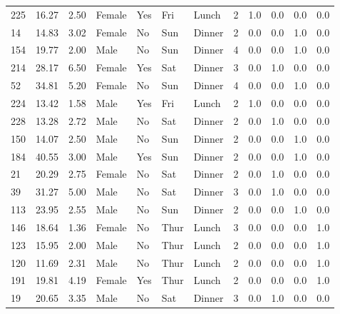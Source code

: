 \documentclass[
  letterpaper,
  DIV=11,
  numbers=noendperiod]{scrreprt}
\begin{document}
\begin{tabular}{lrrllllrrrrr}
225 &       16.27 &  2.50 &  Female &    Yes &   Fri &   Lunch &     2 &     1.0 &     0.0 &     0.0 &      0.0 \\
14  &       14.83 &  3.02 &  Female &     No &   Sun &  Dinner &     2 &     0.0 &     0.0 &     1.0 &      0.0 \\
154 &       19.77 &  2.00 &    Male &     No &   Sun &  Dinner &     4 &     0.0 &     0.0 &     1.0 &      0.0 \\
214 &       28.17 &  6.50 &  Female &    Yes &   Sat &  Dinner &     3 &     0.0 &     1.0 &     0.0 &      0.0 \\
52  &       34.81 &  5.20 &  Female &     No &   Sun &  Dinner &     4 &     0.0 &     0.0 &     1.0 &      0.0 \\
224 &       13.42 &  1.58 &    Male &    Yes &   Fri &   Lunch &     2 &     1.0 &     0.0 &     0.0 &      0.0 \\
228 &       13.28 &  2.72 &    Male &     No &   Sat &  Dinner &     2 &     0.0 &     1.0 &     0.0 &      0.0 \\
150 &       14.07 &  2.50 &    Male &     No &   Sun &  Dinner &     2 &     0.0 &     0.0 &     1.0 &      0.0 \\
184 &       40.55 &  3.00 &    Male &    Yes &   Sun &  Dinner &     2 &     0.0 &     0.0 &     1.0 &      0.0 \\
21  &       20.29 &  2.75 &  Female &     No &   Sat &  Dinner &     2 &     0.0 &     1.0 &     0.0 &      0.0 \\
39  &       31.27 &  5.00 &    Male &     No &   Sat &  Dinner &     3 &     0.0 &     1.0 &     0.0 &      0.0 \\
113 &       23.95 &  2.55 &    Male &     No &   Sun &  Dinner &     2 &     0.0 &     0.0 &     1.0 &      0.0 \\
146 &       18.64 &  1.36 &  Female &     No &  Thur &   Lunch &     3 &     0.0 &     0.0 &     0.0 &      1.0 \\
123 &       15.95 &  2.00 &    Male &     No &  Thur &   Lunch &     2 &     0.0 &     0.0 &     0.0 &      1.0 \\
120 &       11.69 &  2.31 &    Male &     No &  Thur &   Lunch &     2 &     0.0 &     0.0 &     0.0 &      1.0 \\
191 &       19.81 &  4.19 &  Female &    Yes &  Thur &   Lunch &     2 &     0.0 &     0.0 &     0.0 &      1.0 \\
19  &       20.65 &  3.35 &    Male &     No &   Sat &  Dinner &     3 &     0.0 &     1.0 &     0.0 &      0.0 \\

\end{tabular}
\end{document}
